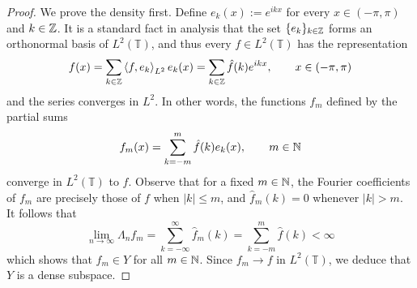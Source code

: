 \begin{proof}
	We prove the density first. Define $e_k(x) := e^{ikx}$ for every $x \in (-\pi,\pi)$ and $k \in \mathbb{Z}$. It is a standard fact in analysis that the set $\{e_k\}_{k \in \mathbb{Z}}$ forms an orthonormal basis of $L^2(\mathbb{T})$, and thus every $f \in L^2(\mathbb{T})$ has the representation
	\begin{equation*}
		f(x) = \sum_{k \in \mathbb{Z}} \braket{f,e_k}_{L^2} e_k(x) = \sum_{k \in \mathbb{Z}} \hat{f}(k) e^{ikx}, \qquad x \in (-\pi,\pi)
	\end{equation*}
	and the series converges in $L^2$. In other words, the functions $f_m$ defined by the partial sums
	\begin{equation*}
		f_m(x) = \sum_{k=-m}^m \hat{f}(k) e_k(x), \qquad m \in \mathbb{N}
	\end{equation*}
	converge in $L^2(\mathbb{T})$ to $f$. Observe that for a fixed $m\in\mathbb{N}$, the Fourier coefficients of $f_m$ are precisely those of $f$ when $|k|\le m$, and $\hat{f}_m(k)=0$ whenever $|k|>m$. It follows that
	\begin{equation*}
		\lim_{n\to \infty} \Lambda_n f_m = \sum_{k=-\infty}^\infty \hat{f}_m(k) = \sum_{k=-m}^m \hat{f}(k) < \infty
	\end{equation*}
	which shows that $f_m \in Y$ for all $m\in\mathbb{N}$. Since $f_m \to f$ in $L^2(\mathbb{T})$, we deduce that $Y$ is a dense subspace.
	

\end{proof}
